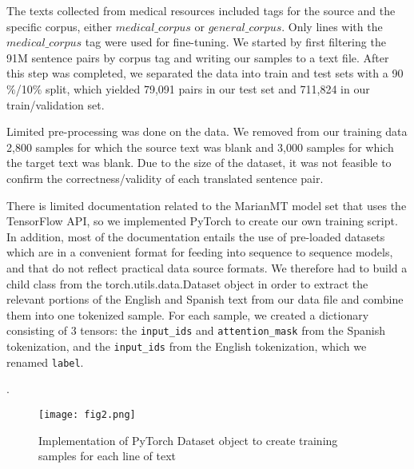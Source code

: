 \documentclass{article}
\begin{document}
\begin{multicols}{2}
The texts collected from medical resources included tags for the source and the specific corpus, either $medical\_corpus$ or $general\_corpus$.  Only lines with the $medical\_corpus$ tag were used for fine-tuning. We started by first filtering the 91M sentence pairs by corpus tag and writing our samples to a text file. After this step was completed, we separated the data into train and test sets with a 90$\%$/10$\%$ split, which yielded  79,091 pairs in our test set and 711,824 in our train/validation set. 

Limited pre-processing was done on the data. We removed from our training data 2,800 samples for which the source text was blank and 3,000 samples for which the target text was blank. Due to the size of the dataset, it was not feasible to confirm the correctness/validity of each translated sentence pair. 

There is limited documentation related to the MarianMT model set that uses the TensorFlow API, so we implemented PyTorch to create our own training script. In addition, most of the documentation entails the use of pre-loaded datasets which are in a convenient format for feeding into sequence to sequence models, and that do not reflect practical data source formats. We therefore had to build a child class from  the torch.utils.data.Dataset object in order to extract the relevant portions of the English and Spanish  text from our data file and combine them into one tokenized sample. For each sample, we created a dictionary consisting of 3 tensors: the \verb|input_ids| and \verb|attention_mask| from the Spanish tokenization, and the \verb|input_ids| from the English tokenization, which we renamed \verb|label|.

\columnbreak .
\end{multicols}

\begin{figure}[h]
\texttt{[image: fig2.png]}
\caption{\small{Implementation of PyTorch Dataset object to create training samples for each line of text}}
\label{\small{fig:figure2}}
\end{figure}
\end{document}
